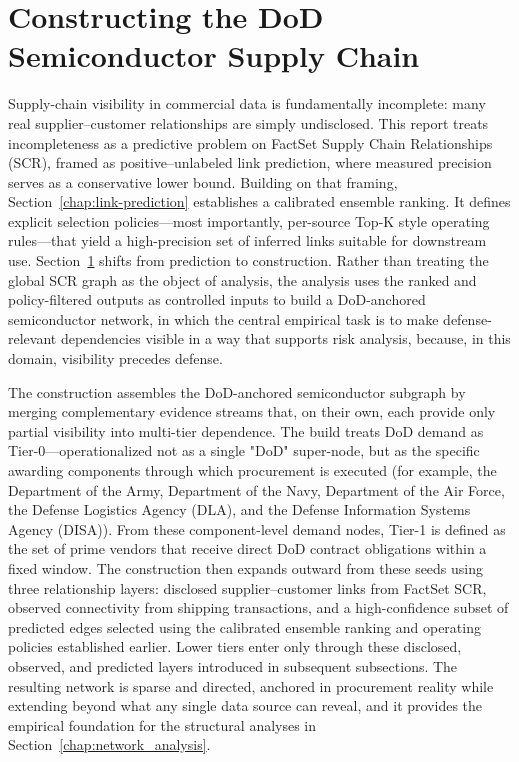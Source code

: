 \chapter{Constructing the DoD Semiconductor Supply Chain}
\label{chap:dod-supply-chain}

Supply-chain visibility in commercial data is fundamentally incomplete: many real supplier--customer relationships are simply undisclosed. This report treats incompleteness as a predictive problem on FactSet Supply Chain Relationships (SCR), framed as positive--unlabeled link prediction, where measured precision serves as a conservative lower bound. Building on that framing, Section~\ref{chap:link-prediction} establishes a calibrated ensemble ranking. It defines explicit selection policies---most importantly, per-source Top-K style operating rules---that yield a high-precision set of inferred links suitable for downstream use. Section~\ref{chap:dod-supply-chain} shifts from prediction to construction. Rather than treating the global SCR graph as the object of analysis, the analysis uses the ranked and policy-filtered outputs as controlled inputs to build a DoD-anchored semiconductor network, in which the central empirical task is to make defense-relevant dependencies visible in a way that supports risk analysis, because, in this domain, visibility precedes defense.

The construction assembles the DoD-anchored semiconductor subgraph by merging complementary evidence streams that, on their own, each provide only partial visibility into multi-tier dependence. The build treats DoD demand as Tier-0---operationalized not as a single "DoD" super-node, but as the specific awarding components through which procurement is executed (for example, the Department of the Army, Department of the Navy, Department of the Air Force, the Defense Logistics Agency (DLA), and the Defense Information Systems Agency (DISA)). From these component-level demand nodes, Tier-1 is defined as the set of prime vendors that receive direct DoD contract obligations within a fixed window. The construction then expands outward from these seeds using three relationship layers: disclosed supplier--customer links from FactSet SCR, observed connectivity from shipping transactions, and a high-confidence subset of predicted edges selected using the calibrated ensemble ranking and operating policies established earlier. Lower tiers enter only through these disclosed, observed, and predicted layers introduced in subsequent subsections. The resulting network is sparse and directed, anchored in procurement reality while extending beyond what any single data source can reveal, and it provides the empirical foundation for the structural analyses in Section~\ref{chap:network_analysis}.

